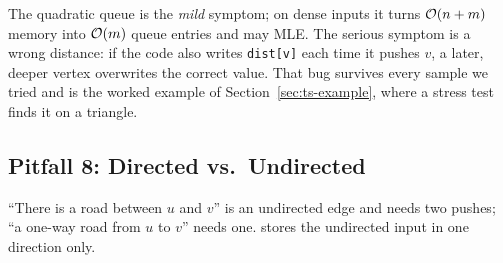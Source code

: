 \begin{diagrambox}
\end{diagrambox}

The quadratic queue is the \emph{mild} symptom; on dense inputs it turns $\mathcal{O}(n+m)$ memory into $\mathcal{O}(m)$ queue entries and may MLE. The serious symptom is a wrong distance: if the code also writes \texttt{dist[v]} each time it pushes $v$, a later, deeper vertex overwrites the correct value. That bug survives every sample we tried and is the worked example of Section~\ref{sec:ts-example}, where a stress test finds it on a triangle.

\subsection{Pitfall 8: Directed vs.\ Undirected}
\label{ssec:ts-p8}

``There is a road between $u$ and $v$'' is an undirected edge and needs two pushes; ``a one-way road from $u$ to $v$'' needs one.  stores the undirected input in one direction only.

